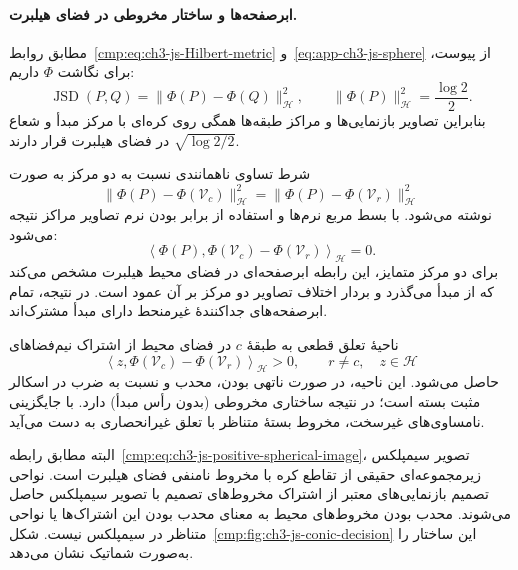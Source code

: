 \paragraph{ابرصفحه‌ها و ساختار مخروطی در فضای هیلبرت.}
مطابق روابط~\eqref{cmp:eq:ch3-js-Hilbert-metric}
و~\eqref{eq:app-ch3-js-sphere} از پیوست، برای
نگاشت $\Phi$ داریم:
\[
\operatorname{JSD}(P,Q)
=\|\Phi(P)-\Phi(Q)\|_{\mathcal H}^{2},
\qquad
\|\Phi(P)\|_{\mathcal H}^{2}=\frac{\log2}{2}.
\]
بنابراین تصاویر بازنمایی‌ها و مراکز طبقه‌ها
همگی روی کره‌ای با مرکز مبدأ و شعاع
$\sqrt{\log2/2}$ در فضای هیلبرت قرار دارند.

شرط تساوی ناهمانندی نسبت به دو مرکز به
صورت
\[
\|\Phi(P)-\Phi(\mathcal V_c)\|_{\mathcal H}^{2}
=\|\Phi(P)-\Phi(\mathcal V_r)\|_{\mathcal H}^{2}
\]
نوشته می‌شود. با بسط مربع نرم‌ها و استفاده از
برابر بودن نرم تصاویر مراکز نتیجه می‌شود:
\begin{equation}\label{cmp:eq:ch3-js-origin-hyperplane}
\boxed{
\left\langle\Phi(P),
\Phi(\mathcal V_c)-\Phi(\mathcal V_r)
\right\rangle_{\mathcal H}=0.
}
\end{equation}
برای دو مرکز متمایز، این رابطه ابرصفحه‌ای
در فضای محیط هیلبرت مشخص می‌کند که از مبدأ
می‌گذرد و بردار اختلاف تصاویر دو مرکز بر آن
عمود است. در نتیجه، تمام ابرصفحه‌های
جداکنندهٔ غیرمنحط دارای مبدأ مشترک‌اند.

ناحیهٔ تعلق قطعی به طبقهٔ $c$ در فضای محیط
از اشتراک نیم‌فضاهای
\[
\left\langle z,\Phi(\mathcal V_c)
-\Phi(\mathcal V_r)\right\rangle_{\mathcal H}>0,
\qquad r\ne c,\quad z\in\mathcal H
\]
حاصل می‌شود. این ناحیه، در صورت ناتهی بودن،
محدب و نسبت به ضرب در اسکالر مثبت بسته است؛
در نتیجه ساختاری مخروطی (بدون رأس مبدأ) دارد.
با جایگزینی نامساوی‌های غیرسخت، مخروط بستهٔ
متناظر با تعلق غیرانحصاری به دست می‌آید.

البته مطابق
رابطه~\eqref{cmp:eq:ch3-js-positive-spherical-image}،
تصویر سیمپلکس زیرمجموعه‌ای حقیقی از تقاطع
کره با مخروط نامنفی فضای هیلبرت است.
نواحی تصمیم بازنمایی‌های معتبر از اشتراک
مخروط‌های تصمیم با تصویر سیمپلکس حاصل می‌شوند.
محدب بودن مخروط‌های محیط به معنای محدب بودن
این اشتراک‌ها یا نواحی متناظر در سیمپلکس نیست.
شکل~\ref{cmp:fig:ch3-js-conic-decision} این
ساختار را به‌صورت شماتیک نشان می‌دهد.

